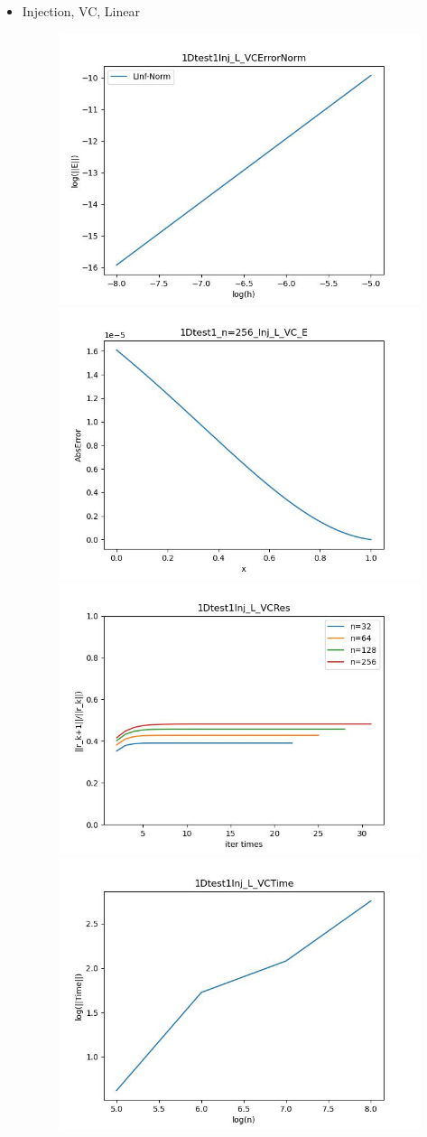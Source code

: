 \documentclass{article}
\begin{document}
\begin{itemize}
    \item Injection, VC, Linear
    \begin{figure}[h]
        \centering
        \includegraphics[width=0.35\linewidth]{1Dtest1Inj_L_VCErrorNorm.jpg}
        \includegraphics[width=0.35\linewidth]{1Dtest1_n=256_Inj_L_VC_E.jpg}
        \includegraphics[width=0.35\linewidth]{1Dtest1Inj_L_VCRes.jpg}
        \includegraphics[width=0.35\linewidth]{1Dtest1Inj_L_VCTime.jpg}
    \end{figure}
    

\end{itemize}
\end{document}
